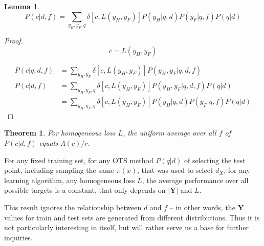 \documentclass[a4paper]{article}
\newtheorem{theorem}{Theorem}[section]
\newtheorem{lemma}{Lemma}
\begin{document}
\begin{lemma}
\begin{equation}
  P(c|d,f) = \sum_{y_H,y_F,q}\delta\left[c,L\left(y_H, y_F\right)\right] P\left(y_H|q, d\right)
  P\left(y_F| q, f\right)P\left(q|d\right)
\end{equation}
\label{lm:Pcdf}
\end{lemma}

\begin{proof}
\begin{equation}
  c = L\left(y_H, y_F\right)
\end{equation}

\begin{equation}
\begin{split}
  P\left(c|q,d,f\right)& = \sum_{y_H,y_F} \delta\left[c,L\left(y_H,
      y_F\right)\right] P\left(y_H, y_F| q,d,f\right) \\
  P\left(c|d,f\right) & = \sum_{y_H,y_F,q} \delta\left[c,L\left(y_H,
      y_F\right)\right] P\left(y_H, y_F|q, d,f\right) P\left(q|d\right) \\
  & = \sum_{y_H,y_F,q} \delta\left[c,L\left(y_H, y_F\right)\right]
  P\left(y_H|q,d\right) P\left(y_F|q,f\right) P\left(q|d\right)
\end{split}
\end{equation}
\end{proof}

\begin{theorem}
  For homogeneous loss $L$, the uniform average over all $f$ of
  $P\left(c|d,f\right)$ equals $\Lambda\left(c\right)/r$.
  \label{th:Pcdf}
\end{theorem}

For any fixed training set, for any OTS method $P(q|d)$ of selecting
the test point, including sampling the same $\pi(x)$, that was used to
select $d_X$, for any learning algorithm, any homogeneous loss $L$,
the average performance over all possible targets is a constant, that
only depends on $\left|\mathbf{Y}\right|$ and $L$.

This result ignores the relationship between $d$ and $f$ -- in other
words, the $\mathbf{Y}$ values for train and test sets are generated
from different distributions. Thus it is not particularly interesting
in itself, but will rather serve us a base for further inquiries.
\end{document}
